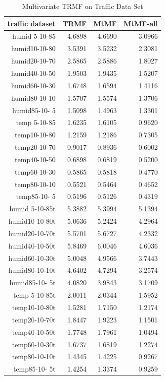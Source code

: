 \begin{table}[htbp]
\caption{Multivariate TRMF on Traffic Data Set}
\label{traffic}
\begin{tabular}{r | r r r}
traffic dataset	&TRMF	&MtMF	&MtMF-all \\ \hline
humid 5-10-85	&4.6898	&4.6690	&3.0966\\
humid10-10-80	&3.5391	&3.5232	&2.3081\\
humid20-10-70	&2.5865	&2.5886	&1.8027\\
humid40-10-50	&1.9503	&1.9435	&1.5207\\
humid60-10-30	&1.6748	&1.6594	&1.4116\\
humid80-10-10	&1.5707	&1.5574	&1.3706\\
humid85-10- 5	&1.5098	&1.4963	&1.3301\\
 temp 5-10-85	&1.6235	&1.6105	&0.9620\\
 temp10-10-80	&1.2159	&1.2186	&0.7305\\
 temp20-10-70	&0.9017	&0.8936	&0.6002\\
 temp40-10-50	&0.6898	&0.6819	&0.5200\\
 temp60-10-30	&0.5865	&0.5818	&0.4770\\
 temp80-10-10	&0.5521	&0.5464	&0.4652\\
 temp85-10- 5	&0.5196	&0.5126	&0.4319\\
humid 5-10-85t	&5.3882	&5.3994	&5.1394\\
humid10-10-80t	&5.0636	&5.2424	&4.2964\\
humid20-10-70t	&5.5701	&5.6727	&4.2332\\
humid40-10-50t	&5.8469	&6.0046	&4.6036\\
humid60-10-30t	&5.0048	&4.9566	&3.7443\\
humid80-10-10t	&4.6402	&4.7294	&3.2574\\
humid85-10- 5t	&4.0820	&3.9843	&3.1709\\
 temp 5-10-85t	&2.0011	&2.0344	&1.5952\\
 temp10-10-80t	&1.5281	&1.7150	&1.2174\\
 temp20-10-70t	&1.8447	&1.9223	&1.1501\\
 temp40-10-50t	&1.7748	&1.7961	&1.0494\\
 temp60-10-30t	&1.6737	&1.6819	&1.2274\\
 temp80-10-10t	&1.4345	&1.4225	&0.9267\\
 temp85-10- 5t	&1.4254	&1.3374	&0.9259

\end{tabular}
\end{table}

